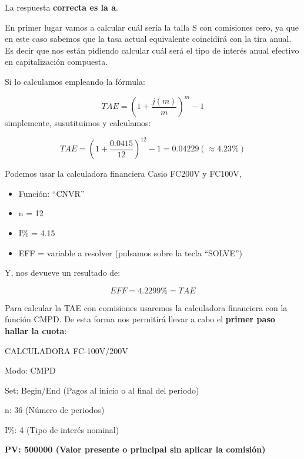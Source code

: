 \documentclass[
  letterpaper,
  DIV=11,
  numbers=noendperiod]{scrartcl}
\begin{document}
\begin{tcolorbox}[enhanced jigsaw, colframe=quarto-callout-tip-color-frame, opacityback=0, opacitybacktitle=0.6, colback=white, leftrule=.75mm, bottomtitle=1mm, colbacktitle=quarto-callout-tip-color!10!white, coltitle=black, toprule=.15mm, left=2mm, breakable, toptitle=1mm, titlerule=0mm, title=\textcolor{quarto-callout-tip-color}{\faLightbulb}\hspace{0.5em}{Solución}, arc=.35mm, rightrule=.15mm, bottomrule=.15mm]

La respuesta \textbf{correcta es la a}.

En primer lugar vamos a calcular cuál sería la talla S con comisiones
cero, ya que en este caso sabemos que la tasa actual equivalente
coincidirá con la tira anual. Es decir que nos están pidiendo calcular
cuál será el tipo de interés anual efectivo en capitalización compuesta.

Si lo calculamos empleando la fórmula:

\[TAE=\left(1+\frac{j\left(m\right)}{m}\right)^m-1\] simplemente,
susutituimos y calculamos:

\[TAE=\left(1+\frac{0.0415}{12}\right)^{12}-1=0.04229\left(\approx 4.23\%\right)\]

Podemos usar la calculadora financiera Casio FC200V y FC100V,

\begin{itemize}
\item
  Función: ``CNVR''
\item
  n = 12
\item
  I\% = 4.15
\item
  EFF = variable a resolver (pulsamos sobre la tecla ``SOLVE'')
\end{itemize}

Y, nos devueve un resultado de:

\[EFF = 4.2299\% = TAE\]

Para calcular la TAE con comisiones usaremos la calculadora financiera
con la función CMPD. De esta forma nos permitirá llevar a cabo el
\textbf{primer paso hallar la cuota}:

CALCULADORA FC-100V/200V

Modo: CMPD

Set: Begin/End (Pagos al inicio o al final del periodo)

n: 36 (Número de periodos)

I\%: 4 (Tipo de interés nominal)

\textbf{PV: 500000 (Valor presente o principal sin aplicar la comisión)}


\end{tcolorbox}
\end{document}
